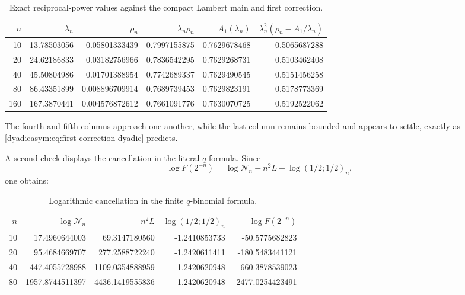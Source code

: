 \documentclass[11pt,oneside]{article}
\theoremstyle{definition}
\theoremstyle{remark}
\begin{document}
\begin{table}[htbp]
\centering
\small
\begin{tabular}{@{}rrrrrr@{}}
\toprule
$n$ & $\lambda_n$ & $\rho_n$ & $\lambda_n\rho_n$
& $A_1(\lambda_n)$ & $\lambda_n^2(\rho_n-A_1/\lambda_n)$\\
\midrule
10  & 13.78503056  & 0.05801333439 & 0.7997155875 & 0.7629678468 & 0.5065687288\\
20  & 24.62186833  & 0.03182756966 & 0.7836542295 & 0.7629268731 & 0.5103462408\\
40  & 45.50804986  & 0.01701388954 & 0.7742689337 & 0.7629490545 & 0.5151456258\\
80  & 86.43351899  & 0.008896709914& 0.7689739453 & 0.7629823191 & 0.5178773369\\
160 & 167.3870441   & 0.004576872612& 0.7661091776 & 0.7630070725 & 0.5192522062\\
\bottomrule
\end{tabular}
\caption{Exact reciprocal-power values against the compact Lambert main and first correction.}
\label{dyadicasym:tab:numerics}
\end{table}

The fourth and fifth columns approach one another, while the last column remains bounded and
appears to settle, exactly as \eqref{dyadicasym:eq:first-correction-dyadic} predicts.

A second check displays the cancellation in the literal $q$-formula.  Since
\begin{equation*}
 \log F(2^{-n})=\log\mathcal N_n-n^2L-\log(1/2;1/2)_n,
\end{equation*}
one obtains:

\begin{table}[htbp]
\centering
\small
\begin{tabular}{@{}rrrrr@{}}
\toprule
$n$ & $\log\mathcal N_n$ & $n^2L$ & $\log(1/2;1/2)_n$ & $\log F(2^{-n})$\\
\midrule
10 & 17.4960644003 & 69.3147180560 & -1.2410853733 & -50.5775682823\\
20 & 95.4684669707 & 277.2588722240 & -1.2420611411 & -180.5483441121\\
40 & 447.4055728988& 1109.0354888959& -1.2420620948 & -660.3878539023\\
80 & 1957.8744511397&4436.1419555836& -1.2420620948 & -2477.0254423491\\
\bottomrule
\end{tabular}
\caption{Logarithmic cancellation in the finite $q$-binomial formula.}
\label{dyadicasym:tab:q-cancellation}
\end{table}
\end{document}
